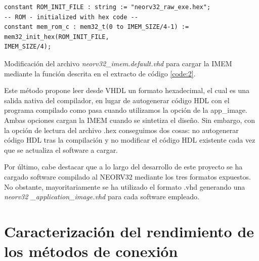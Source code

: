 \begin{code}
\begin{verbatim}
constant ROM_INIT_FILE : string := "neorv32_raw_exe.hex";
-- ROM - initialized with hex code --
constant mem_rom_c : mem32_t(0 to IMEM_SIZE/4-1) := mem32_init_hex(ROM_INIT_FILE, 
IMEM_SIZE/4);
\end{verbatim}
\caption{Modificación del archivo \textit{neorv32\_imem.default.vhd} para cargar la IMEM mediante la función descrita en el extracto de código \ref{code:2}.}
\label{code:3}
\end{code}

Este método propone leer desde VHDL un formato hexadecimal, el cual es una salida nativa del compilador, en lugar de autogenerar código HDL con el programa compilado como pasa cuando utilizamos la opción de la app\_image. 
Ambas opciones cargan la IMEM cuando se sintetiza el diseño.
Sin embargo, con la opción de lectura del archivo .hex conseguimos dos cosas: no autogenerar código HDL tras la compilación y no modificar el código HDL existente cada vez que se actualiza el software a cargar.

Por último, cabe destacar que a lo largo del desarrollo de este proyecto se ha cargado software compilado al NEORV32 mediante los tres formatos expuestos.
No obstante, mayoritariamente se ha utilizado el formato .vhd generando una \textit{neorv32   \_application\_image.vhd} para cada software empleado.

\section{Caracterización del rendimiento de los métodos de conexión}

\label{Carac}


